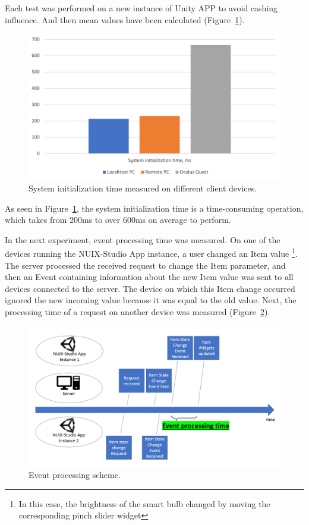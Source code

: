 Each test was performed on a new instance of Unity APP to avoid cashing influence. And then mean values have been calculated (Figure~\ref{fig:SystemInitTime-figure}).

\begin{figure}
  \centering
  \includegraphics[width=0.9\linewidth]{figures/SystemInitTime.png}
  \caption{System initialization time measured on different client devices.}
  \label{fig:SystemInitTime-figure}
\end{figure}

As seen in Figure~\ref{fig:SystemInitTime-figure}, the system initialization time is a time-consuming operation, which takes from 200ms to over 600ms on average to perform.

In the next experiment, event processing time was measured. On one of the devices running the NUIX-Studio App instance, a user changed an Item value \footnote{In this case, the brightness of the smart bulb changed by moving the corresponding pinch slider widget}. The server processed the received request to change the Item parameter, and then an Event containing information about the new Item value was sent to all devices connected to the server. The device on which this Item change occurred ignored the new incoming value because it was equal to the old value. Next, the processing time of a request on another device was measured (Figure~\ref{fig:EventProcessingScheme-figure}).

\begin{figure}
  \centering
  \includegraphics[width = 0.9 \linewidth]{figures/EventProcessingScheme.png}
  \caption{Event processing scheme.}
  \label{fig:EventProcessingScheme-figure}
\end{figure}


